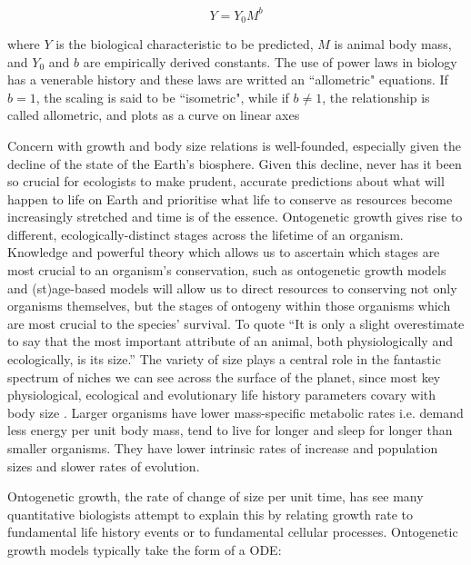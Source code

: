 \documentclass[a4paper]{article} %
\begin{document}
        \begin{equation}
            Y = Y_0 M^b
        \end{equation}

        where $Y$ is the biological characteristic to be predicted, $M$ is animal body mass, and $Y_0$ and $b$ are empirically derived constants. The use of power laws in biology has a venerable history and these laws are writted an ``allometric" equations. If $b = 1$, the scaling is said to be ``isometric", while if $b \neq 1$, the relationship is called allometric, and plots as a curve on linear axes \autocite{brown2000-scaling-book}

        Concern with growth and body size relations is well-founded, especially given the decline of the state of the Earth's biosphere. Given this decline, never has it been so crucial for ecologists to make prudent, accurate predictions about what will happen to life on Earth and prioritise what life to conserve as resources become increasingly stretched and time is of the essence. Ontogenetic growth gives rise to different, ecologically-distinct stages across the lifetime of an organism. Knowledge and powerful theory which allows us to ascertain which stages are most crucial to an organism's conservation, such as ontogenetic growth models and (st)age-based models will allow us to direct resources to conserving not only organisms themselves, but the stages of ontogeny within those organisms which are most crucial to the species' survival. To quote \cite{Bartholomew1981} ``It is only a slight overestimate to say that the most important attribute of an animal, both physiologically and ecologically, is its size.'' The variety of size plays a central role in the fantastic spectrum of niches we can see across the surface of the planet, since most key physiological, ecological and evolutionary life history parameters covary with body size \autocite{peters1983, brown2000-scaling-book,schmidt1984scaling,Marshall2019b}. Larger organisms have lower mass-specific metabolic rates i.e. demand less energy per unit body mass, tend to live for longer and sleep for longer than smaller organisms. They have lower intrinsic rates of increase and population sizes and slower rates of evolution. 

        Ontogenetic growth, the rate of change of size per unit time, has see many quantitative biologists attempt to explain this by relating growth rate to fundamental life history events or to fundamental cellular processes. Ontogenetic growth models typically take the form of a ODE:
\end{document}

